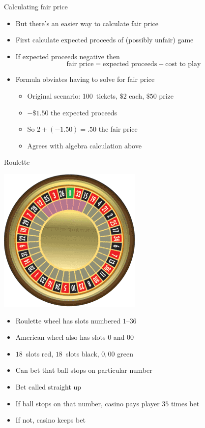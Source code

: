 \documentclass[handout]{beamer}
\theoremstyle{definition}
\begin{document}
\begin{frame}{Calculating fair price}
\begin{itemize}
\item But there's an easier way to calculate fair price
\item First calculate expected proceeds of (possibly unfair) game
\item If expected proceeds \alert{negative} then
\[\text{fair price}=\text{expected proceeds}+\text{cost to play}\]
\item Formula obviates having to solve for fair price
\begin{example}
\begin{itemize}
\item Original scenario: 100~tickets, $\$2$ each, $\$50$ prize
\item $-\$1.50$ the expected proceeds
\item So $2+\left(-1.50\right)=.50$ the fair price
\item Agrees with algebra calculation above
\end{itemize}
\end{example}
\end{itemize}
\end{frame}

\begin{frame}{Roulette}
\begin{multicols}{2}
\includegraphics[scale=.6]{Roulette}
\begin{itemize}
\item Roulette wheel has slots numbered $1$--$36$
\item American wheel also has slots $0$ and $00$
\item $18$~slots red, $18$~slots black, $0,00$ green
\item Can bet that ball stops on particular number
\item Bet called \alert{straight up}
\item If ball stops on that number, casino pays player
$35$ times bet
\item If not, casino keeps bet
\end{itemize}
\end{multicols}
\end{frame}
\end{document}

